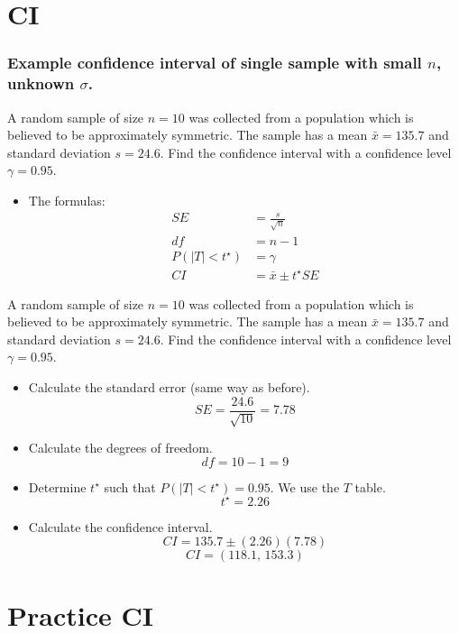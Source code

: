 \documentclass[slidestop,compress,mathserif]{beamer}
\begin{document}
\section{CI}

\begin{frame}
\frametitle{Example confidence interval of single sample with small $n$, unknown $\sigma$.}
A random sample of size $n=10$ was collected from a population which is believed to be approximately symmetric. The sample has a mean $\bar{x}=135.7$ and standard deviation $s=24.6$. Find the confidence interval with a confidence level $\gamma = 0.95$.
\pause

\begin{itemize}
\item The formulas:
\begin{align*}
SE &= \frac{s}{\sqrt{n}} \\
df &= n-1\\
P(|T|<t^{\star}) &= \gamma\\ 
CI &= \bar{x} \pm t^{\star} SE 
\end{align*}
\end{itemize}
\end{frame}


\begin{frame}
A random sample of size $n=10$ was collected from a population which is believed to be approximately symmetric. The sample has a mean $\bar{x}=135.7$ and standard deviation $s=24.6$. Find the confidence interval with a confidence level $\gamma = 0.95$.
\pause
\begin{itemize}
\item Calculate the standard error (same way as before).
\pause
$$SE = \frac{24.6}{\sqrt{10}} = 7.78 $$
\pause
\item Calculate the degrees of freedom.
\pause
$$df = 10-1 = 9 $$
\pause
\item Determine $t^\star$ such that $P(|T|<t^{\star}) = 0.95$. We use the $T$ table.
\pause
$$t^{\star} = 2.26 $$
\pause \vspace{-10pt}
\item Calculate the confidence interval.
\pause
$$CI = 135.7 \pm (2.26)(7.78) $$
$$CI = (118.1,\,153.3) $$
\end{itemize}
\end{frame}

\section{Practice CI}
\end{document}
